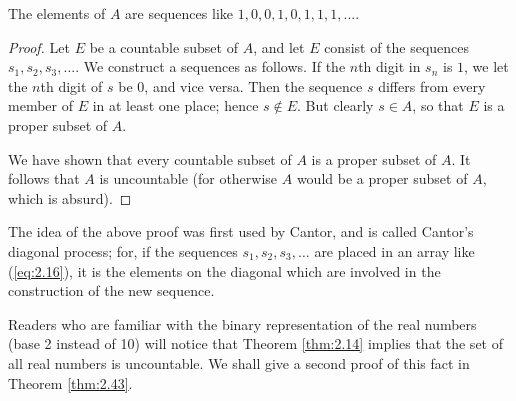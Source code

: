The elements of $A$ are sequences like $1, 0, 0, 1, 0, 1, 1, 1, ... .$

\begin{proof}
    Let $E$ be a countable subset of $A$, 
    and let $E$ consist of the sequences $s_1, s_2 , s_3 , ...$. 
    We construct a sequences as follows. 
    If the $n$th digit in $s_n$ is $1$, 
    we let the $n$th digit of $s$ be $0$, and vice versa. 
    Then the sequence $s$ differs from every member of $E$ in at least one place; hence $s \not\in E$. 
    But clearly $s \in A$, so that $E$ is a proper subset of $A$.

    We have shown that 
    every countable subset of $A$ is a proper subset of $A$. 
    It follows that $A$ is uncountable 
    (for otherwise $A$ would be a proper subset of $A$, which is absurd).
\end{proof}

The idea of the above proof was first used by Cantor, 
and is called Cantor's diagonal process; 
for, if the sequences $s_1, s_2 , s_3 ,\dots$ are placed in an array like (\ref{eq:2.16}), 
it is the elements on the diagonal which are involved in the construction of the new sequence.

Readers who are familiar with the binary representation of the real numbers (base 2 instead of 10) will notice that 
Theorem \ref{thm:2.14} implies that the set of all real numbers is uncountable. 
We shall give a second proof of this fact in Theorem \ref{thm:2.43}.